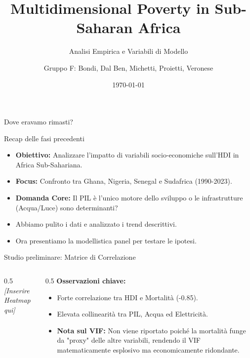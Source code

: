 \documentclass{beamer}
\title{Multidimensional Poverty in Sub-Saharan Africa}
\subtitle{Analisi Empirica e Variabili di Modello}
\author{Gruppo F: Bondi, Dal Ben, Michetti, Proietti, Veronese}
\date{\today}
\begin{document}
\begin{frame}
    \titlepage
\end{frame}

\begin{frame}{Dove eravamo rimasti?}
    \begin{block}{Recap delle fasi precedenti}
        \begin{itemize}
            \item \textbf{Obiettivo:} Analizzare l'impatto di variabili socio-economiche sull'HDI in Africa Sub-Sahariana.
            \item \textbf{Focus:} Confronto tra Ghana, Nigeria, Senegal e Sudafrica (1990-2023).
            \item \textbf{Domanda Core:} Il PIL è l'unico motore dello sviluppo o le infrastrutture (Acqua/Luce) sono determinanti?
        \end{itemize}
    \end{block}
    \begin{itemize}
        \item Abbiamo pulito i dati e analizzato i trend descrittivi.
        \item Ora presentiamo la modellistica panel per testare le ipotesi.
    \end{itemize}
\end{frame}

\begin{frame}{Studio preliminare: Matrice di Correlazione}
    \begin{columns}
        \begin{column}{0.5\textwidth}
            \centering \textit{[Inserire Heatmap qui]}
        \end{column}
        \begin{column}{0.5\textwidth}
            \small
            \textbf{Osservazioni chiave:}
            \begin{itemize}
                \item Forte correlazione tra HDI e Mortalità (-0.85).
                \item Elevata collinearità tra PIL, Acqua ed Elettricità.
                \item \textbf{Nota sul VIF:} Non viene riportato poiché la mortalità funge da "proxy" delle altre variabili, rendendo il VIF matematicamente esplosivo ma economicamente ridondante.
            \end{itemize}
        \end{column}
    \end{columns}
\end{frame}
\end{document}
